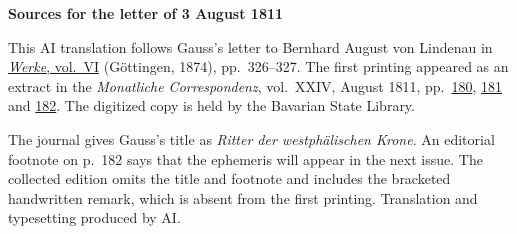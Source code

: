 \clearpage\thispagestyle{empty}
\begin{center}\textbf{Sources for the letter of 3 August 1811}\end{center}
\noindent This AI translation follows Gauss’s letter to Bernhard August von Lindenau in \href{https://gdz.sub.uni-goettingen.de/id/PPN236007467}{\textit{Werke}, vol.~VI} (Göttingen, 1874), pp.~326--327. The first printing appeared as an extract in the \textit{Monatliche Correspondenz}, vol.~XXIV, August 1811, pp.~\href{https://api.digitale-sammlungen.de/iiif/image/v2/bsb10538613_00190/full/1600,/0/default.jpg}{180}, \href{https://api.digitale-sammlungen.de/iiif/image/v2/bsb10538613_00191/full/1600,/0/default.jpg}{181} and \href{https://api.digitale-sammlungen.de/iiif/image/v2/bsb10538613_00192/full/1600,/0/default.jpg}{182}. The digitized copy is held by the Bavarian State Library.
\par\smallskip\noindent The journal gives Gauss’s title as \textit{Ritter der westphälischen Krone}. An editorial footnote on p.~182 says that the ephemeris will appear in the next issue. The collected edition omits the title and footnote and includes the bracketed handwritten remark, which is absent from the first printing. Translation and typesetting produced by AI.
\clearpage
